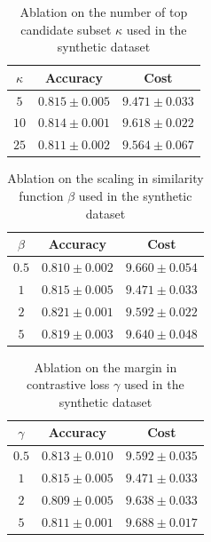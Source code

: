 \smallskip
\begin{table}[H]
    \centering
    \caption{Ablation on the number of top candidate subset $\kappa$ used in the synthetic dataset}
    \label{tab:kappa}
    \begin{tabular}{ccc}
        \toprule
        $\kappa$ & Accuracy & Cost \\
        \midrule
        $5$& $0.815\pm0.005$ & $9.471\pm0.033$ \\
        $10$ & $0.814 \pm 0.001$ & $9.618 \pm 0.022$\\
        $25$ & $0.811 \pm 0.002$ & $9.564 \pm 0.067$ \\

        \bottomrule
    \end{tabular}
\end{table}
\smallskip

\begin{table}[H]
    \centering
    \caption{Ablation on the scaling in similarity function $\beta$ used in the synthetic dataset}
    \label{tab:beta}
    \begin{tabular}{ccc}
        \toprule
        $\beta$ & Accuracy & Cost \\
        \midrule
        $0.5$ & $0.810 \pm 0.002$ & $9.660 \pm 0.054$ \\
        $1$   & $0.815\pm0.005$   & $9.471\pm0.033$ \\
        $2$   & $0.821 \pm 0.001$ & $9.592 \pm 0.022$ \\
        $5$   & $0.819 \pm 0.003$ & $9.640 \pm 0.048$ \\
        \bottomrule
    \end{tabular}
\end{table}

\smallskip

\begin{table}[H]
    \centering
    \caption{Ablation on the margin in contrastive loss $\gamma$ used in the synthetic dataset}
    \label{tab:gamma}
    \begin{tabular}{ccc}
        \toprule
        $\gamma$ & Accuracy & Cost \\
        \midrule
        $0.5$ & $0.813 \pm 0.010$& $9.592 \pm 0.035$ \\
        $1$   & $0.815\pm0.005$ & $9.471\pm0.033$ \\
        $2$   & $0.809\pm 0.005$& $9.638\pm 0.033$\\
        $5$   & $0.811\pm 0.001$& $9.688\pm 0.017$\\
        \bottomrule
    \end{tabular}
\end{table}


